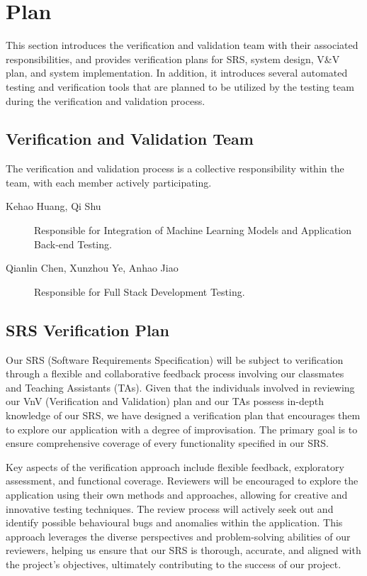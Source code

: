 \documentclass[12pt, titlepage]{article}
\begin{document}
\section{Plan}

This section introduces the verification and validation team with their
associated responsibilities, and provides verification plans for SRS, system
design, V\&V plan, and system implementation. In addition, it introduces several
automated testing and verification tools that are planned to be utilized by the
testing team during the verification and validation process.

\subsection{Verification and Validation Team}

The verification and validation process is a collective responsibility within
the team, with each member actively participating.

\begin{description}
\item[Kehao Huang, Qi Shu] Responsible for Integration of Machine Learning Models
  and Application Back-end Testing.
\item[Qianlin Chen, Xunzhou Ye, Anhao Jiao] Responsible for Full Stack Development
  Testing.
\end{description}

\subsection{SRS Verification Plan}

Our SRS (Software Requirements Specification) will be subject to verification
through a flexible and collaborative feedback process involving our classmates
and Teaching Assistants (TAs). Given that the individuals involved in reviewing
our VnV (Verification and Validation) plan and our TAs possess in-depth
knowledge of our SRS, we have designed a verification plan that encourages them
to explore our application with a degree of improvisation. The primary goal is
to ensure comprehensive coverage of every functionality specified in our SRS.

Key aspects of the verification approach include flexible feedback, exploratory
assessment, and functional coverage. Reviewers will be encouraged to explore the
application using their own methods and approaches, allowing for creative and
innovative testing techniques. The review process will actively seek out and
identify possible behavioural bugs and anomalies within the application. This
approach leverages the diverse perspectives and problem-solving abilities of our
reviewers, helping us ensure that our SRS is thorough, accurate, and aligned
with the project's objectives, ultimately contributing to the success of our
project.
\end{document}
